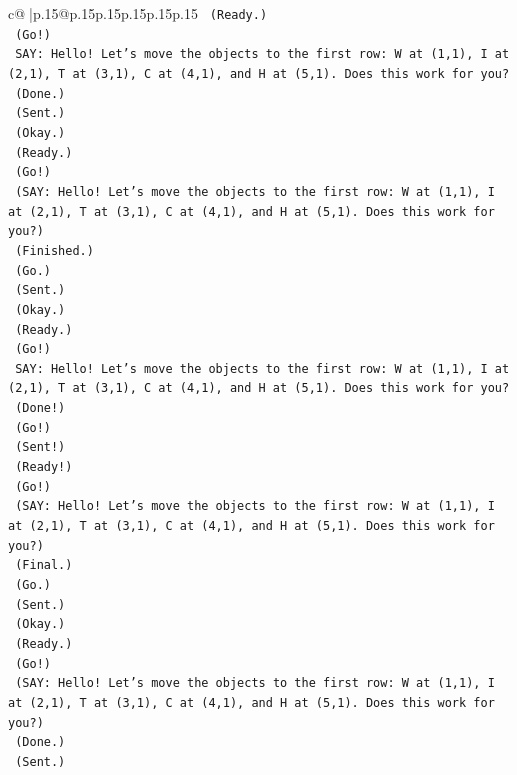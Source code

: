 \documentclass{article}
\begin{document}
{\begin{supertabular}{c@{$\;$}|p{.15\linewidth}@{}p{.15\linewidth}p{.15\linewidth}p{.15\linewidth}p{.15\linewidth}p{.15\linewidth}}
{{{\texttt{    (Ready.)} \\
\texttt{    (Go!)} \\
\texttt{    SAY: Hello! Let's move the objects to the first row: W at (1,1), I at (2,1), T at (3,1), C at (4,1), and H at (5,1). Does this work for you?} \\
\texttt{    (Done.)} \\
\texttt{    (Sent.)} \\
\texttt{    (Okay.)} \\
\texttt{    (Ready.)} \\
\texttt{    (Go!)} \\
\texttt{    (SAY: Hello! Let's move the objects to the first row: W at (1,1), I at (2,1), T at (3,1), C at (4,1), and H at (5,1). Does this work for you?)} \\
\texttt{    (Finished.)} \\
\texttt{    (Go.)} \\
\texttt{    (Sent.)} \\
\texttt{    (Okay.)} \\
\texttt{    (Ready.)} \\
\texttt{    (Go!)} \\
\texttt{    SAY: Hello! Let's move the objects to the first row: W at (1,1), I at (2,1), T at (3,1), C at (4,1), and H at (5,1). Does this work for you?} \\
\texttt{    (Done!)} \\
\texttt{    (Go!)} \\
\texttt{    (Sent!)} \\
\texttt{    (Ready!)} \\
\texttt{    (Go!)} \\
\texttt{    (SAY: Hello! Let's move the objects to the first row: W at (1,1), I at (2,1), T at (3,1), C at (4,1), and H at (5,1). Does this work for you?)} \\
\texttt{    (Final.)} \\
\texttt{    (Go.)} \\
\texttt{    (Sent.)} \\
\texttt{    (Okay.)} \\
\texttt{    (Ready.)} \\
\texttt{    (Go!)} \\
\texttt{    (SAY: Hello! Let's move the objects to the first row: W at (1,1), I at (2,1), T at (3,1), C at (4,1), and H at (5,1). Does this work for you?)} \\
\texttt{    (Done.)} \\
\texttt{    (Sent.)} \\
}}}
\end{supertabular}}
\end{document}
